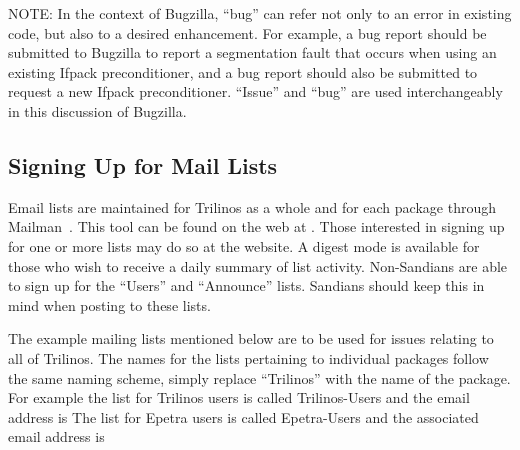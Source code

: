 \documentclass[12pt,relax]{TrilinosUserGuide}
\begin{document}
NOTE: In the context of Bugzilla, ``bug'' can refer not only to an error in 
existing code, but also to a desired enhancement.  For example, a bug report 
should be submitted to Bugzilla to report a segmentation fault that occurs 
when using an existing Ifpack preconditioner, and a bug report should also be
submitted to request a new Ifpack preconditioner.  ``Issue'' and ``bug'' are 
used interchangeably in this discussion of Bugzilla.

\subsection{Signing Up for Mail Lists}
\label{subsect:MailMan}
Email lists are maintained for Trilinos as a whole and for each package 
through Mailman~\cite{Mailman}.  This tool can be found on the web at 
\newline
{}.  
Those interested in signing 
up for one or more lists may do so at the website.  A digest mode is 
available for those who wish to receive a daily summary of list activity.  
Non-Sandians are able to sign up for the ``Users'' and ``Announce'' 
lists.  Sandians should keep this in mind when posting to these lists.

\begin{minipage}[c]{\textwidth}
\begin{minipage}[l]{.6\textwidth}
The example mailing lists mentioned below are to be used 
for issues relating to all of Trilinos.  The names for the lists pertaining to 
individual packages follow the same naming scheme, simply replace ``Trilinos'' 
with the name of the package.  For example the list for Trilinos users is 
called Trilinos-Users and the email address is 
  The list 
for Epetra users is called Epetra-Users and the associated email address is 
\end{minipage}\hfill
{}
\end{minipage}
\end{document}
